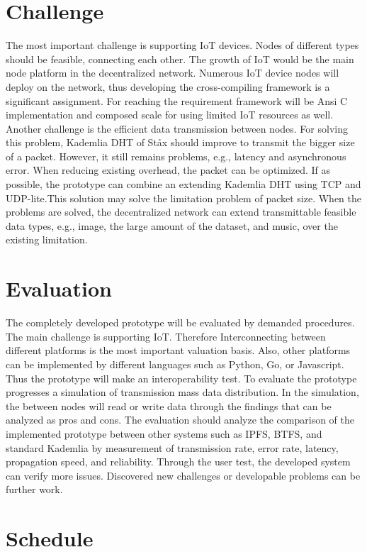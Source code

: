\section{Challenge}
The most important challenge is supporting IoT devices. Nodes of different types should be feasible, connecting each other. The growth of IoT would be the main node platform in the decentralized network. Numerous IoT device nodes will deploy on the network, thus developing the cross-compiling framework is a significant assignment. For reaching the requirement framework will be Ansi C implementation and composed scale for using limited IoT resources as well. Another challenge is the efficient data transmission between nodes. For solving this problem, Kademlia DHT of St\aa x should improve to transmit the bigger size of a packet. However, it still remains problems, e.g., latency and asynchronous error. When reducing existing overhead, the packet can be optimized. If as possible, the prototype can combine an extending Kademlia DHT using TCP and UDP-lite.This solution may solve the limitation problem of packet size. When the problems are solved, the decentralized network can extend transmittable feasible data types, e.g., image, the large amount of the dataset, and music, over the existing limitation.

\section{Evaluation}
The completely developed prototype will be evaluated by demanded procedures. The main challenge is supporting IoT. Therefore Interconnecting between different platforms is the most important valuation basis. Also, other platforms can be implemented by different languages such as Python, Go, or Javascript. Thus the prototype will make an interoperability test. To evaluate the prototype progresses a simulation of transmission mass data distribution. In the simulation, the between nodes will read or write data through the findings that can be analyzed as pros and cons. The evaluation should analyze the comparison of the implemented prototype between other systems such as IPFS, BTFS, and standard Kademlia by measurement of transmission rate, error rate, latency, propagation speed, and reliability. Through the user test, the developed system can verify more issues. Discovered new challenges or developable problems can be further work.

\section{Schedule}

